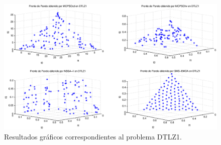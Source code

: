 \clearpage
\newpage

\begin{figure}
      \begin{center}
	  \includegraphics[scale=0.45]{Cap4/rdtlz1r.eps}
      \end{center}
	\caption{Resultados gr\'aficos correspondientes al problema DTLZ1.}
      \label{fig:rDTLZ1}
\end{figure}

\clearpage
\newpage


